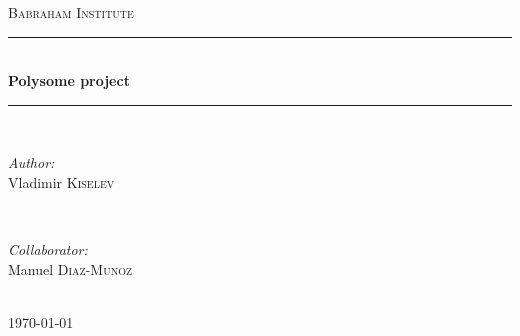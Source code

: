 \documentclass[12pt]{article} %
\begin{document}

\begin{titlepage}

\newcommand{\HRule}{\rule{\linewidth}{0.5mm}} %

\center %

\textsc{\LARGE Babraham Institute}\\[1.5cm] %

\HRule \\[0.4cm]
{ \huge \bfseries Polysome project}\\[0.4cm] %
\HRule \\[1.5cm]

\begin{minipage}{0.4\textwidth}
\begin{flushleft} \large
\emph{Author:}\\
Vladimir \textsc{Kiselev} %
\end{flushleft}
\end{minipage}
~
\begin{minipage}{0.4\textwidth}
\begin{flushright} \large
\emph{Collaborator:} \\
Manuel \textsc{Diaz-Munoz} %
\end{flushright}
\end{minipage}\\[4cm]

{\large \today}\\[3cm] %


\vfill %

\end{titlepage}


\tableofcontents %
\end{document}
